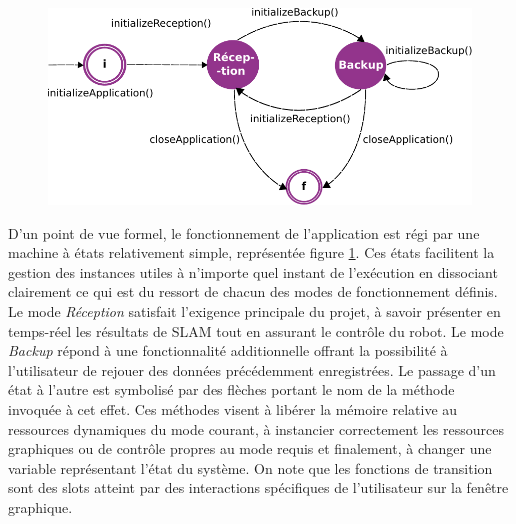 \begin{figure}[h]
  \centering
    \includegraphics[width=.7\linewidth]{figures/state_machine}  
  \label{fig:stateMachine}
\end{figure}

D'un point de vue formel, le fonctionnement de l'application est régi par une machine à états relativement simple, représentée figure \ref{fig:stateMachine}.
Ces états facilitent la gestion des instances utiles à n'importe quel instant de l'exécution en dissociant clairement ce qui est du ressort de chacun des modes de fonctionnement définis. 
Le mode \emph{Réception} satisfait l'exigence principale du projet, à savoir présenter en temps-réel les résultats de \gls{SLAM} tout en assurant le contrôle du robot. 
Le mode \emph{Backup} répond à une fonctionnalité additionnelle offrant la possibilité à l'utilisateur de rejouer des données précédemment enregistrées. 
Le passage d'un état à l'autre est symbolisé par des flèches portant le nom de la méthode invoquée à cet effet.
Ces méthodes visent à libérer la mémoire relative au ressources dynamiques du mode courant, à instancier correctement les ressources graphiques ou de contrôle propres au mode requis et finalement, à changer une variable représentant 
l'état du système. 
On note que les fonctions de transition sont des slots atteint par des interactions spécifiques de l'utilisateur sur la fenêtre graphique. 

